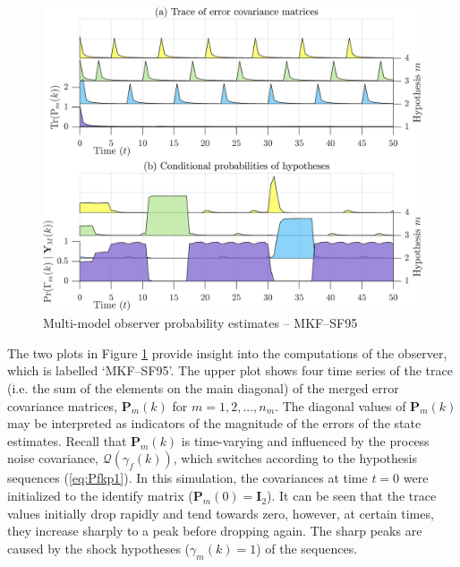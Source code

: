 \begin{figure}[htp]
	\centering
	\includegraphics[width=12cm]{images/rod_MKF_test_sim_MKF_SF95_prob.png}
	\caption{Multi-model observer probability estimates – MKF--SF95}
	\label{fig:rod-obs-sim-test-probs-SF95}
\end{figure}
The two plots in Figure \ref{fig:rod-obs-sim-test-probs-SF95} provide insight into the computations of the observer, which is labelled `MKF--SF95'. The upper plot shows four time series of the trace (i.e. the sum of the elements on the main diagonal) of the merged error covariance matrices, $\mathbf{P}_m(k)$ for $m=1,2,...,n_m$. The diagonal values of $\mathbf{P}_m(k)$ may be interpreted as indicators of the magnitude of the errors of the state estimates. Recall that $\mathbf{P}_m(k)$ is time-varying and influenced by the process noise covariance, $\mathcal{Q}(\gamma_f(k))$, which switches according to the hypothesis sequences (\ref{eq:Pfkp1}). In this simulation, the covariances at time $t=0$ were initialized to the identify matrix ($\mathbf{P}_m(0)=\mathbf{I}_2$). It can be seen that the trace values initially drop rapidly and tend towards zero, however, at certain times, they increase sharply to a peak before dropping again. The sharp peaks are caused by the shock hypotheses ($\gamma_m(k)=1$) of the sequences.

